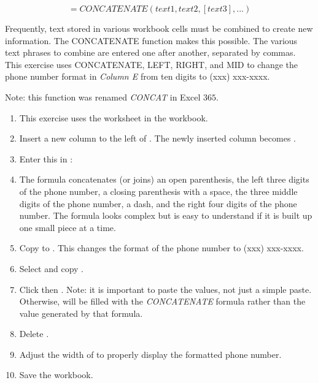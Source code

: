 \[ =CONCATENATE(text1, text2, [text3], ...) \]

Frequently, text stored in various workbook cells must be combined to create new information. The CONCATENATE function makes this possible. The various text phrases to combine are entered one after another, separated by commas. This exercise uses CONCATENATE, LEFT, RIGHT, and MID to change the phone number format in \textit{Column E} from ten digits to (xxx) xxx-xxxx.

 Note: this function was renamed \textit{CONCAT} in Excel $ 365 $.

\begin{enumbox}
	\begin{enumerate}
		\item This exercise uses the  worksheet in the  workbook.
		\item Insert a new column to the left of . The newly inserted column becomes .
		\item Enter this in : 
		\item The formula concatenates (or joins) an open parenthesis, the left three digits of the phone number, a closing parenthesis with a space, the three middle digits of the phone number, a dash, and the right four digits of the phone number. The formula looks complex but is easy to understand if it is built up one small piece at a time.
		\item Copy  to . This changes the format of the phone number to (xxx) xxx-xxxx.
		\item Select and copy .
		\item Click  then . Note: it is important to paste the values, not just a simple paste. Otherwise,  will be filled with the \textit{CONCATENATE} formula rather than the value generated by that formula.
		\item Delete .
		\item Adjust the width of  to properly display the formatted phone number.
		\item Save the  workbook.
	\end{enumerate}
\end{enumbox}
	
